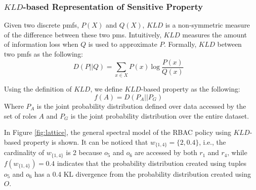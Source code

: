 \subsubsection{$KLD$-based Representation of Sensitive Property}

Given two discrete pmfs, $P(X)$ and $Q(X)$, $KLD$ is a non-symmetric measure of the difference between these two pms. Intuitively, $KLD$ measures the amount of information loss when $Q$ is used to approximate $P$. Formally, $KLD$ between two pmfs as the following:
\begin{equation*}
D(P||Q) = \sum_{x \in X} P(x) \  \text{log} \ \frac{P(x)}{Q(x)}
\end{equation*}


Using the definition of $KLD$, we define $KLD$-based property as the following:
\begin{equation}
f(A) = D(P_A || P_G)
\label{eq:f_div}
\end{equation}
Where $P_A$ is the joint probability distribution defined over data accessed by the set of roles $A$ and $P_G$ is the joint probability distribution over the entire dataset.

\begin{ex}
In Figure \ref{fig:lattice}, the general spectral model of the RBAC policy using $KLD$-based property is shown. It can be noticed that $w_{\{1,4\}} =\{ 2,0.4\}$, i.e., the cardinality of $w_{\{1,4\}}$ is 2 because $o_5$ and $o_{6}$ are accessed by both $r_1$ and $r_4$, while $f(w_{\{1,4\}})=0.4$ indicates that the probability distribution created using tuples $o_5$ and $o_6$ has a 0.4 KL divergence from the probability distribution created using $O$.  
\end{ex}




